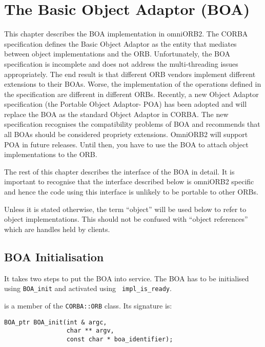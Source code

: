 \documentclass[11pt,twoside,onecolumn]{book}
\begin{document}
\chapter{The Basic Object Adaptor (BOA)}

This chapter describes the BOA implementation in omniORB2. The CORBA
specification defines the Basic Object Adaptor as the entity that mediates
between object implementations and the ORB. Unfortunately, the BOA
specification is incomplete and does not address the multi-threading issues
appropriately. The end result is that different ORB vendors implement
different extensions to their BOAs. Worse, the implementation of the operations
defined in the specification are different in different ORBs. Recently, a new
Object Adaptor specification (the Portable Object Adaptor- POA) has been
adopted and will replace the BOA as the standard Object Adaptor in
CORBA. The new specification recognises the compatibility problems of BOA
and recommends that all BOAs should be considered propriety extensions.
OmniORB2 will support POA in future releases. Until then, you have to
use the BOA to attach object implementations to the ORB. 

The rest of this chapter describes the interface of the BOA in detail. It
is important to recognise that the interface described below is omniORB2
specific and hence the code using this interface is unlikely to be portable
to other ORBs.

Unless it is stated otherwise, the term ``object'' will be used below to
refer to object implementations. This should not be confused with ``object
references'' which are handles held by clients.

\section{BOA Initialisation}

It takes two steps to put the BOA into service. The BOA has to be
initialised using {\tt BOA\_init} and activated using {\tt
impl\_is\_ready}.


 is a member of the {\tt CORBA::ORB} class. Its signature is:

{\small
\begin{verbatim}
BOA_ptr BOA_init(int & argc,
                 char ** argv,
                 const char * boa_identifier);
\end{verbatim}
}
\end{document}
